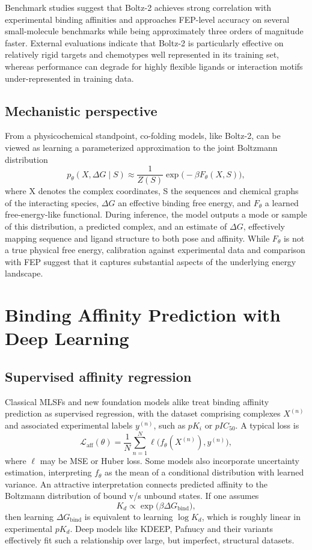\documentclass[12pt]{article}
\begin{document}
Benchmark studies\cite{CH13_passaro2025boltz2,CH13_wan2026reliability} suggest that Boltz-2 achieves strong correlation with experimental binding affinities and approaches FEP-level accuracy on several small-molecule benchmarks while being approximately three orders of magnitude faster. External evaluations indicate that Boltz-2 is particularly effective on relatively rigid targets and chemotypes well represented in its training set, whereas performance can degrade for highly flexible ligands or interaction motifs under-represented in training data.\cite{CH13_wan2026reliability}

\subsection{Mechanistic perspective}

From a physicochemical standpoint, co-folding models, like Boltz-2, can be viewed as learning a parameterized approximation to the joint Boltzmann distribution
\[
p_{\theta}(X, \Delta G \mid S) \approx \frac{1}{Z(S)} \exp\big( - \beta F_{\theta}(X, S) \big),
\]
where X denotes the complex coordinates, S the sequences and chemical graphs of the interacting species, $\Delta G$ an effective binding free energy, and $F_{\theta}$ a learned free-energy-like functional. During inference, the model outputs a mode or sample of this distribution, a predicted complex, and an estimate of $\Delta G$, effectively mapping sequence and ligand structure to both pose and affinity. While $F_{\theta}$ is not a true physical free energy, calibration against experimental data and comparison with FEP suggest that it captures substantial aspects of the underlying energy landscape.\cite{CH13_passaro2025boltz2}

\section{Binding Affinity Prediction with Deep Learning}

\subsection{Supervised affinity regression}

Classical MLSFs and new foundation models alike treat binding affinity prediction as supervised regression, with the dataset comprising complexes $X^{(n)}$ and associated experimental labels $y^{(n)}$, such as $pK_i$ or $pIC_{50}$. A typical loss is
\[
\mathcal{L}_{\text{aff}}(\theta) = \frac{1}{N} \sum_{n=1}^{N} \ell\big(f_{\theta}(X^{(n)}), y^{(n)}\big),
\]
where $\ell$ may be MSE or Huber loss. Some models also incorporate uncertainty estimation, interpreting $f_{\theta}$ as the mean of a conditional distribution with learned variance. An attractive interpretation connects predicted affinity to the Boltzmann distribution of bound v/s unbound states. If one assumes
\[
K_d \propto \exp\big(\beta \Delta G_{\text{bind}}\big),
\]
then learning $\Delta G_{\text{bind}}$ is equivalent to learning $\log K_d$, which is roughly linear in experimental $pK_d$. Deep models like KDEEP, Pafnucy and their variants effectively fit such a relationship over large, but imperfect, structural datasets.\cite{CH13_meli2022dlreview,CH13_durant2025robustly}
\end{document}

